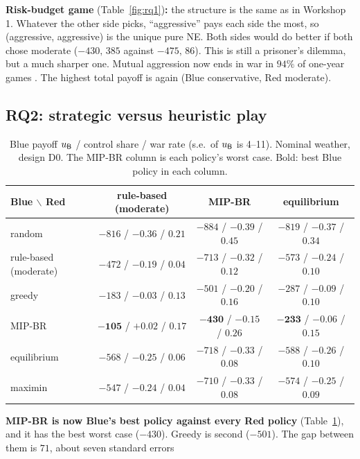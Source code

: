 \begin{addblock}
\begin{minipage}[t]{0.51\textwidth}
\smallskip\textbf{Risk-budget game} (Table~\ref{fig:rq1})\textbf{:} the structure is the same as in Workshop 1.
Whatever the other side picks, ``aggressive'' pays each side the most, so (aggressive, aggressive) is the unique pure
NE. Both sides would do better if both chose moderate ($-430,\,385$ against $-475,\,86$). This is still a prisoner's
dilemma, but a much sharper one. Mutual aggression now ends in war in $94\%$ of one-year games . The highest total payoff is again (Blue conservative, Red moderate).
\end{minipage}

\subsection{RQ2: strategic versus heuristic play}
\begin{table}[!ht]\centering\footnotesize\setlength{\tabcolsep}{4pt}\renewcommand{\arraystretch}{0.9}
\begin{tabular}{l|ccc}
\toprule
Blue $\backslash$ Red & rule-based (moderate) & MIP-BR & equilibrium\\\midrule
random & $-816$ / $-0.36$ / $0.21$ & $-884$ / $-0.39$ / $0.45$ & $-819$ / $-0.37$ / $0.34$\\
rule-based (moderate) & $-472$ / $-0.19$ / $0.04$ & $-713$ / $-0.32$ / $0.12$ & $-573$ / $-0.24$ / $0.10$\\
greedy & $-183$ / $-0.03$ / $0.13$ & $-501$ / $-0.20$ / $0.16$ & $-287$ / $-0.09$ / $0.10$\\
MIP-BR & $\mathbf{-105}$ / $+0.02$ / $0.17$ & $\mathbf{-430}$ / $-0.15$ / $0.26$ & $\mathbf{-233}$ / $-0.06$ / $0.15$\\
equilibrium & $-568$ / $-0.25$ / $0.06$ & $-718$ / $-0.33$ / $0.08$ & $-588$ / $-0.26$ / $0.10$\\
maximin & $-547$ / $-0.24$ / $0.04$ & $-710$ / $-0.33$ / $0.08$ & $-574$ / $-0.25$ / $0.09$\\
\bottomrule
\end{tabular}
\caption{Blue payoff $u_{\mathsf{B}}$ / control share / war rate (s.e.\ of $u_{\mathsf{B}}$ is 4--11). Nominal weather, design D0. The
MIP-BR column is each policy's worst case. Bold: best Blue policy in each column.}
\label{tab:policies}
\end{table}
\textbf{MIP-BR is now Blue's best policy against every Red policy} (Table~\ref{tab:policies}), and it has the best worst
case ($-430$). Greedy is second ($-501$). The gap between them is $71$, about seven standard errors 
\end{addblock}
